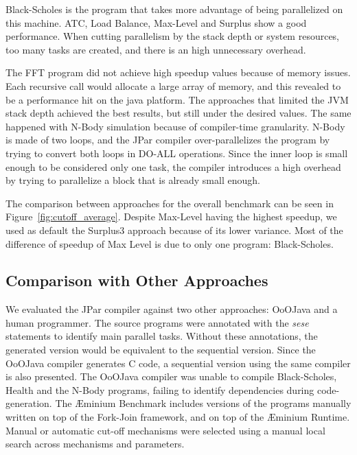 \documentclass[smallextended]{svjour3}
\begin{document}
Black-Scholes is the program that takes more advantage of being parallelized on this machine. ATC, Load Balance, Max-Level and Surplus show a good performance. When cutting parallelism by the stack depth or system resources, too many tasks are created, and there is an high unnecessary overhead.


The FFT program did not achieve high speedup values because of memory issues. Each recursive call would allocate a large array of memory, and this revealed to be a performance hit on the java platform. The approaches that limited the JVM stack depth achieved the best results, but still under the desired values. The same happened with N-Body simulation because of compiler-time granularity. N-Body is made of two loops, and the JPar compiler over-parallelizes the program by trying to convert both loops in DO-ALL operations. Since the inner loop is small enough to be considered only one task, the compiler introduces a high overhead by trying to parallelize a block that is already small enough. 

The comparison between approaches for the overall benchmark can be seen in Figure~\ref{fig:cutoff_average}. Despite Max-Level having the highest speedup, we used as default the Surplus3 approach because of its lower variance. Most of the difference of speedup of Max Level is due to only one program: Black-Scholes.


\subsection{Comparison with Other Approaches}

We evaluated the JPar compiler against two other approaches: OoOJava and a human programmer. The source programs were annotated with the \emph{sese} statements to identify main parallel tasks. Without these annotations, the generated version would be equivalent to the sequential version. Since the OoOJava compiler generates C code, a sequential version using the same compiler is also presented. The OoOJava compiler was unable to compile Black-Scholes, Health and the N-Body programs, failing to identify dependencies during code-generation. The Æminium Benchmark includes versions of the programs manually written on top of the Fork-Join framework, and on top of the Æminium Runtime. Manual or automatic cut-off mechanisms were selected using a manual local search across mechanisms and parameters.
\end{document}
